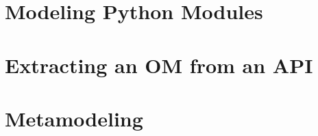 \documentclass[11pt,letterpaper]{article}
\begin{document}
\section{Modeling Python Modules}


\section{Extracting an OM from an API}


\section{Metamodeling}
\end{document}
